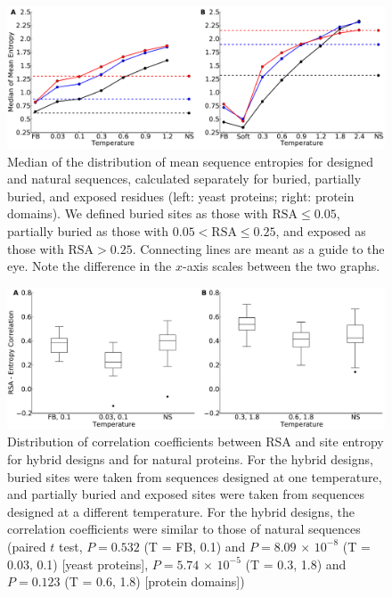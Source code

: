 \documentclass[12pt]{article}
\begin{document}
\begin{figure}[H]
\centerline{\includegraphics[width = 6in]{figures/Mean_Entropy_Position_Lineplot_Combo.pdf}}
\caption{Median of the distribution of mean sequence entropies for designed and natural sequences, calculated separately for buried, partially buried, and exposed residues (left: yeast proteins; right: protein domains). We defined buried sites as those with $\text{RSA}\leq 0.05$, partially buried as those with $0.05<\text{RSA}\leq0.25$, and exposed as those with $\text{RSA}>0.25$. Connecting lines are meant as a guide to the eye. Note the difference in the $x$-axis scales between the two graphs.}
\label{Mean_Entropy_Surface_Core}
\end{figure}


\begin{figure}[H]
\centerline{\includegraphics[width = 6in]{figures/Combo_Mixed_Temp_Correlation_Plot.pdf}}
\caption{Distribution of correlation coefficients between RSA and site entropy for hybrid designs and for natural proteins. {\color{red}For the hybrid designs, buried sites were taken from sequences designed at one temperature, and partially buried and exposed sites were taken from sequences designed at a different temperature. For the hybrid designs, the correlation coefficients were similar to those of natural sequences (paired $t$ test,  $P=0.532$ (T = FB, 0.1)  and  $P= 8.09 $ $\times$ $10^{-8}$ (T = 0.03, 0.1) [yeast proteins], $P= 5.74$  $\times$ $10^{-5}$ (T = 0.3, 1.8) and $P= 0.123$ (T = 0.6, 1.8)  [protein domains])}}
\label{Mixed_RSA_Entropy}
\end{figure}
\end{document}
